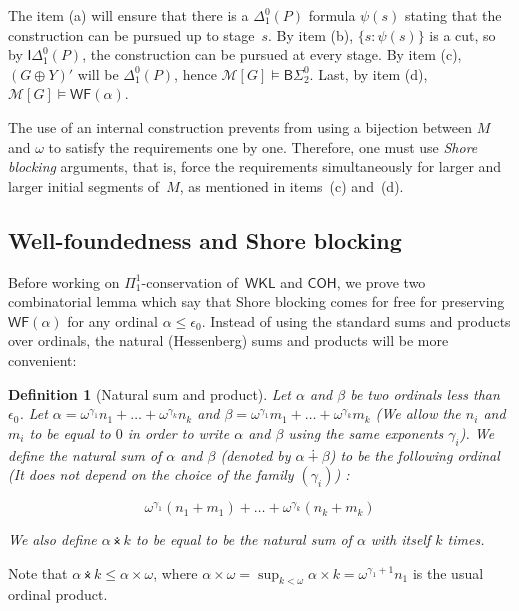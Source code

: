 \documentclass{article}
\numberwithin{theorem}{section}
\newtheorem{definition}[theorem]{Definition}
\newcommand{\WKL}{\mathsf{WKL}}
\newcommand{\COH}{\mathsf{COH}}
\newcommand{\BSig}{\mathsf{B}\Sigma^0}
\newcommand{\IDel}{\mathsf{I}\Delta^0}
\newcommand{\WF}{\mathsf{WF}}
\newcommand{\M}{\mathcal{M}}
\newcommand{\nplus}{\dotplus}
\newcommand{\ntimes}{\dottimes}
\begin{document}
The item (a) will ensure that there is a $\Delta^0_1(P)$ formula $\psi(s)$ stating that the construction can be pursued up to stage~$s$. By item (b), $\{ s : \psi(s) \}$ is a cut, so by $\IDel_1(P)$, the construction can be pursued at every stage. By item (c), $(G \oplus Y)'$ will be $\Delta^0_1(P)$, hence $\M[G] \models \BSig_2$. Last, by item (d), $\M[G] \models \WF(\alpha)$.

The use of an internal construction prevents from using a bijection between $M$ and $\omega$ to satisfy the requirements one by one. Therefore, one must use \emph{Shore blocking} arguments, that is, force the requirements simultaneously for larger and larger initial segments of~$M$, as mentioned in items~(c) and~(d).

\subsection{Well-foundedness and Shore blocking}

Before working on $\Pi^1_1$-conservation of~$\WKL$ and $\COH$, we prove two combinatorial lemma which say that Shore blocking comes for free for preserving $\WF(\alpha)$ for any ordinal $\alpha \leq \epsilon_0$. Instead of using the standard sums and products over ordinals, the natural (Hessenberg) sums and products will be more convenient:

\begin{definition}[Natural sum and product]
Let $\alpha$ and $\beta$ be two ordinals less than $\epsilon_0$. Let $\alpha = \omega^{\gamma_1}n_1 + \dots + \omega^{\gamma_k}n_k$ and $\beta = \omega^{\gamma_1}m_1 + \dots + \omega^{\gamma_k}m_k$ (We allow the $n_i$ and $m_i$ to be equal to $0$ in order to write $\alpha$ and $\beta$ using the same exponents $\gamma_i$). We define the natural sum of $\alpha$ and $\beta$ (denoted by $\alpha \nplus \beta$) to be the following ordinal (It does not depend on the choice of the family $(\gamma_i)$) : 

$$\omega^{\gamma_1}(n_1 + m_1) + \dots + \omega^{\gamma_k}(n_k + m_k)$$

We also define $\alpha \ntimes k$ to be equal to be the natural sum of $\alpha$ with itself $k$ times. %
\end{definition}

Note that $\alpha \ntimes k \leq \alpha \times \omega$, where $\alpha \times \omega = \sup_{k < \omega} \alpha \times k = \omega^{\gamma_1 + 1}n_1$ is the usual ordinal product.
\end{document}
